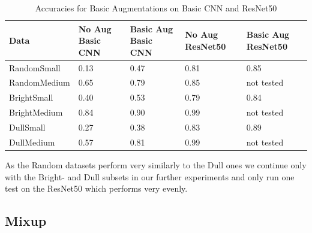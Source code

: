 \documentclass{article}
\begin{document}
\begin{table}[H]
	\caption{Accuracies for Basic Augmentations on Basic CNN and ResNet50}
	\label{sample-table}
	\centering
	\begin{tabular}{lllll}
		\toprule
		Data & No Aug Basic CNN & Basic Aug Basic CNN & No Aug ResNet50 &Basic Aug ResNet50\\
		\midrule
		RandomSmall  & 0.13 & 0.47 & 0.81 & 0.85 \\
		RandomMedium & 0.65 & 0.79 & 0.85 & not tested     \\
		BrightSmall  & 0.40 & 0.53 & 0.79 & 0.84 \\
		BrightMedium & 0.84 & 0.90 & 0.99 & not tested     \\
		DullSmall    & 0.27 & 0.38 & 0.83 & 0.89 \\
		DullMedium   & 0.57 & 0.81 & 0.99 & not tested     \\
		\bottomrule
	\end{tabular}
\end{table}





As the Random datasets perform very similarly to the Dull ones we continue only with the Bright- and Dull subsets in our further experiments and only run one test on the ResNet50 which performs very evenly. 

\subsection{Mixup}
\end{document}
